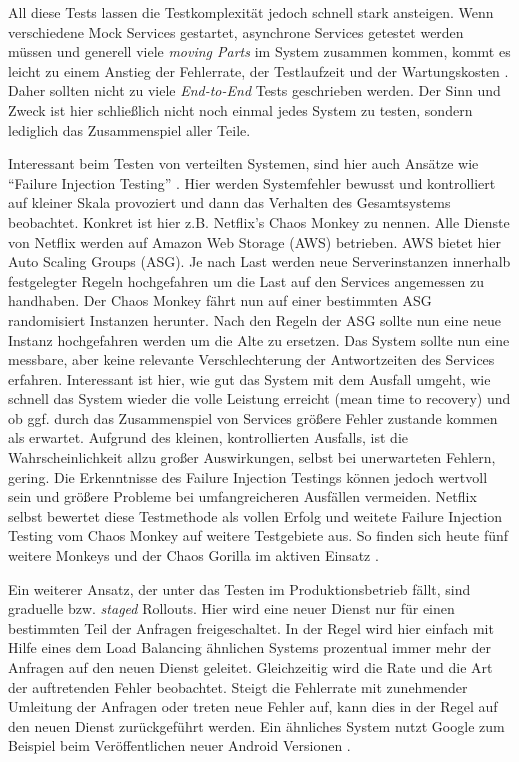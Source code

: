 All diese Tests lassen die Testkomplexität jedoch schnell stark ansteigen. Wenn verschiedene Mock Services gestartet, asynchrone Services getestet werden müssen und generell viele \textit{moving Parts} im System zusammen kommen, kommt es leicht zu einem Anstieg der Fehlerrate, der Testlaufzeit und der Wartungskosten \cite{fowler:mstesting}. Daher sollten nicht zu viele \textit{End-to-End} Tests geschrieben werden. Der Sinn und Zweck ist hier schließlich nicht noch einmal jedes System zu testen, sondern lediglich das Zusammenspiel aller Teile.

Interessant beim Testen von verteilten Systemen, sind hier auch Ansätze wie ``Failure Injection Testing'' \cite[][]{netflix:fit}. Hier werden Systemfehler bewusst und kontrolliert auf kleiner Skala provoziert und dann das Verhalten des Gesamtsystems beobachtet. Konkret ist hier z.B. Netflix's Chaos Monkey \cite[][]{netflix:chaosmonkey} zu nennen. Alle Dienste von Netflix werden auf Amazon Web Storage (AWS) \cite{aws} betrieben. AWS bietet hier Auto Scaling Groups (ASG). Je nach Last werden neue Serverinstanzen innerhalb festgelegter Regeln hochgefahren um die Last auf den Services angemessen zu handhaben. Der Chaos Monkey fährt nun auf einer bestimmten ASG randomisiert Instanzen herunter. Nach den Regeln der ASG sollte nun eine neue Instanz hochgefahren werden um die Alte zu ersetzen. Das System sollte nun eine messbare, aber keine relevante Verschlechterung der Antwortzeiten des Services erfahren. Interessant ist hier, wie gut das System mit dem Ausfall umgeht, wie schnell das System wieder die volle Leistung erreicht (mean time to recovery) und ob ggf. durch das Zusammenspiel von Services größere Fehler zustande kommen als erwartet. Aufgrund des kleinen, kontrollierten Ausfalls, ist die Wahrscheinlichkeit allzu großer Auswirkungen, selbst bei unerwarteten Fehlern, gering. Die Erkenntnisse des Failure Injection Testings können jedoch wertvoll sein und größere Probleme bei umfangreicheren Ausfällen vermeiden. Netflix selbst bewertet diese Testmethode als vollen Erfolg und weitete Failure Injection Testing vom Chaos Monkey auf weitere Testgebiete aus. So finden sich heute fünf weitere Monkeys und der Chaos Gorilla im aktiven Einsatz \cite[][]{netflix:army}.

Ein weiterer Ansatz, der unter das Testen im Produktionsbetrieb fällt, sind graduelle bzw. \textit{staged} Rollouts. Hier wird eine neuer Dienst nur für einen bestimmten Teil der Anfragen freigeschaltet. In der Regel wird hier einfach mit Hilfe eines dem Load Balancing ähnlichen Systems prozentual immer mehr der Anfragen auf den neuen Dienst geleitet. Gleichzeitig wird die Rate und die Art der auftretenden Fehler beobachtet. Steigt die Fehlerrate mit zunehmender Umleitung der Anfragen oder treten neue Fehler auf, kann dies in der Regel auf den neuen Dienst zurückgeführt werden. Ein ähnliches System nutzt Google zum Beispiel beim Veröffentlichen neuer Android Versionen \cite[vgl.][]{Google:staged}.

